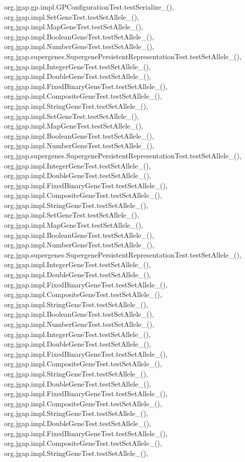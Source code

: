 org.\-jgap.\-gp.\-impl.\-G\-P\-Configuration\-Test.\-test\-Serialize\-\_(), org.\-jgap.\-impl.\-Set\-Gene\-Test.\-test\-Set\-Allele\-\_(), org.\-jgap.\-impl.\-Map\-Gene\-Test.\-test\-Set\-Allele\-\_(), org.\-jgap.\-impl.\-Boolean\-Gene\-Test.\-test\-Set\-Allele\-\_(), org.\-jgap.\-impl.\-Number\-Gene\-Test.\-test\-Set\-Allele\-\_(), org.\-jgap.\-supergenes.\-Supergene\-Persistent\-Representation\-Test.\-test\-Set\-Allele\-\_(), org.\-jgap.\-impl.\-Integer\-Gene\-Test.\-test\-Set\-Allele\-\_(), org.\-jgap.\-impl.\-Double\-Gene\-Test.\-test\-Set\-Allele\-\_(), org.\-jgap.\-impl.\-Fixed\-Binary\-Gene\-Test.\-test\-Set\-Allele\-\_(), org.\-jgap.\-impl.\-Composite\-Gene\-Test.\-test\-Set\-Allele\-\_(), org.\-jgap.\-impl.\-String\-Gene\-Test.\-test\-Set\-Allele\-\_(), org.\-jgap.\-impl.\-Set\-Gene\-Test.\-test\-Set\-Allele\-\_(), org.\-jgap.\-impl.\-Map\-Gene\-Test.\-test\-Set\-Allele\-\_(), org.\-jgap.\-impl.\-Boolean\-Gene\-Test.\-test\-Set\-Allele\-\_(), org.\-jgap.\-impl.\-Number\-Gene\-Test.\-test\-Set\-Allele\-\_(), org.\-jgap.\-supergenes.\-Supergene\-Persistent\-Representation\-Test.\-test\-Set\-Allele\-\_(), org.\-jgap.\-impl.\-Integer\-Gene\-Test.\-test\-Set\-Allele\-\_(), org.\-jgap.\-impl.\-Double\-Gene\-Test.\-test\-Set\-Allele\-\_(), org.\-jgap.\-impl.\-Fixed\-Binary\-Gene\-Test.\-test\-Set\-Allele\-\_(), org.\-jgap.\-impl.\-Composite\-Gene\-Test.\-test\-Set\-Allele\-\_(), org.\-jgap.\-impl.\-String\-Gene\-Test.\-test\-Set\-Allele\-\_(), org.\-jgap.\-impl.\-Set\-Gene\-Test.\-test\-Set\-Allele\-\_(), org.\-jgap.\-impl.\-Map\-Gene\-Test.\-test\-Set\-Allele\-\_(), org.\-jgap.\-impl.\-Boolean\-Gene\-Test.\-test\-Set\-Allele\-\_(), org.\-jgap.\-impl.\-Number\-Gene\-Test.\-test\-Set\-Allele\-\_(), org.\-jgap.\-supergenes.\-Supergene\-Persistent\-Representation\-Test.\-test\-Set\-Allele\-\_(), org.\-jgap.\-impl.\-Integer\-Gene\-Test.\-test\-Set\-Allele\-\_(), org.\-jgap.\-impl.\-Double\-Gene\-Test.\-test\-Set\-Allele\-\_(), org.\-jgap.\-impl.\-Fixed\-Binary\-Gene\-Test.\-test\-Set\-Allele\-\_(), org.\-jgap.\-impl.\-Composite\-Gene\-Test.\-test\-Set\-Allele\-\_(), org.\-jgap.\-impl.\-String\-Gene\-Test.\-test\-Set\-Allele\-\_(), org.\-jgap.\-impl.\-Boolean\-Gene\-Test.\-test\-Set\-Allele\-\_(), org.\-jgap.\-impl.\-Number\-Gene\-Test.\-test\-Set\-Allele\-\_(), org.\-jgap.\-impl.\-Integer\-Gene\-Test.\-test\-Set\-Allele\-\_(), org.\-jgap.\-impl.\-Double\-Gene\-Test.\-test\-Set\-Allele\-\_(), org.\-jgap.\-impl.\-Fixed\-Binary\-Gene\-Test.\-test\-Set\-Allele\-\_(), org.\-jgap.\-impl.\-Composite\-Gene\-Test.\-test\-Set\-Allele\-\_(), org.\-jgap.\-impl.\-String\-Gene\-Test.\-test\-Set\-Allele\-\_(), org.\-jgap.\-impl.\-Double\-Gene\-Test.\-test\-Set\-Allele\-\_(), org.\-jgap.\-impl.\-Fixed\-Binary\-Gene\-Test.\-test\-Set\-Allele\-\_(), org.\-jgap.\-impl.\-Composite\-Gene\-Test.\-test\-Set\-Allele\-\_(), org.\-jgap.\-impl.\-String\-Gene\-Test.\-test\-Set\-Allele\-\_(), org.\-jgap.\-impl.\-Double\-Gene\-Test.\-test\-Set\-Allele\-\_(), org.\-jgap.\-impl.\-Fixed\-Binary\-Gene\-Test.\-test\-Set\-Allele\-\_(), org.\-jgap.\-impl.\-Composite\-Gene\-Test.\-test\-Set\-Allele\-\_(), org.\-jgap.\-impl.\-String\-Gene\-Test.\-test\-Set\-Allele\-\_(), 